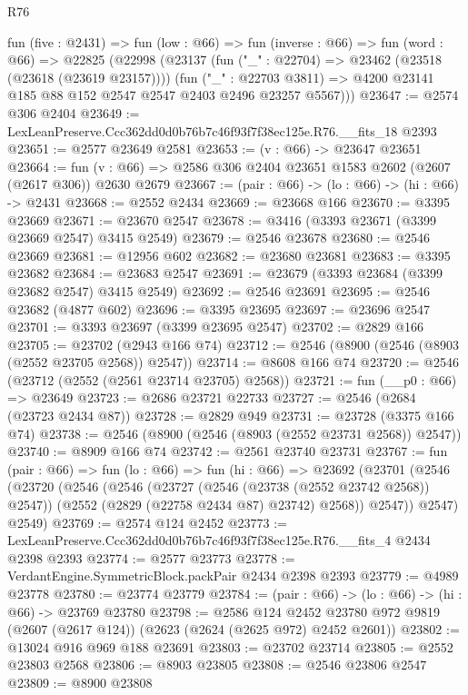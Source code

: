 \begin{lexlean}{R76}
\begin{coremodule}
  fun (five : @2431) =>
  fun (low : @66) =>
  fun (inverse : @66) =>
  fun (word : @66) =>
  @22825
    (@22998
      (@23137
        (fun ("_" : @22704) => @23462 (@23518 (@23618 (@23619 @23157))))
        (fun ("_" : @22703 @3811) =>
        @4200 @23141 @185 @88 @152 @2547 @2547 @2403 @2496 @23257 @5567)))
@23647 := @2574 @306 @2404
@23649 := LexLeanPreserve.Ccc362dd0d0b76b7c46f93f7f38ec125e.R76.__fits_18 @2393
@23651 := @2577 @23649 @2581
@23653 := (v : @66) -> @23647 @23651
@23664 := fun (v : @66) => @2586 @306 @2404 @23651 @1583 @2602 (@2607 (@2617 @306)) @2630 @2679
@23667 := (pair : @66) -> (lo : @66) -> (hi : @66) -> @2431
@23668 := @2552 @2434
@23669 := @23668 @166
@23670 := @3395 @23669
@23671 := @23670 @2547
@23678 := @3416 (@3393 @23671 (@3399 @23669 @2547) @3415 @2549)
@23679 := @2546 @23678
@23680 := @2546 @23669
@23681 := @12956 @602
@23682 := @23680 @23681
@23683 := @3395 @23682
@23684 := @23683 @2547
@23691 := @23679 (@3393 @23684 (@3399 @23682 @2547) @3415 @2549)
@23692 := @2546 @23691
@23695 := @2546 @23682 (@4877 @602)
@23696 := @3395 @23695
@23697 := @23696 @2547
@23701 := @3393 @23697 (@3399 @23695 @2547)
@23702 := @2829 @166
@23705 := @23702 (@2943 @166 @74)
@23712 := @2546 (@8900 (@2546 (@8903 (@2552 @23705 @2568)) @2547))
@23714 := @8608 @166 @74
@23720 := @2546 (@23712 (@2552 (@2561 @23714 @23705) @2568))
@23721 := fun (__p0 : @66) => @23649
@23723 := @2686 @23721 @22733
@23727 := @2546 (@2684 (@23723 @2434 @87))
@23728 := @2829 @949
@23731 := @23728 (@3375 @166 @74)
@23738 := @2546 (@8900 (@2546 (@8903 (@2552 @23731 @2568)) @2547))
@23740 := @8909 @166 @74
@23742 := @2561 @23740 @23731
@23767 := fun (pair : @66) =>
  fun (lo : @66) =>
  fun (hi : @66) =>
  @23692
    (@23701
      (@2546
        (@23720
          (@2546
            (@2546
              (@23727 (@2546 (@23738 (@2552 @23742 @2568)) @2547))
              (@2552 (@2829 (@22758 @2434 @87) @23742) @2568))
            @2547))
        @2547)
      @2549)
@23769 := @2574 @124 @2452
@23773 := LexLeanPreserve.Ccc362dd0d0b76b7c46f93f7f38ec125e.R76.__fits_4 @2434 @2398 @2393
@23774 := @2577 @23773
@23778 := VerdantEngine.SymmetricBlock.packPair @2434 @2398 @2393
@23779 := @4989 @23778
@23780 := @23774 @23779
@23784 := (pair : @66) -> (lo : @66) -> (hi : @66) -> @23769 @23780
@23798 := @2586
    @124
    @2452
    @23780
    @972
    @9819
    (@2607 (@2617 @124))
    (@2623 (@2624 (@2625 @972) @2452 @2601))
@23802 := @13024 @916 @969 @188 @23691
@23803 := @23702 @23714
@23805 := @2552 @23803 @2568
@23806 := @8903 @23805
@23808 := @2546 @23806 @2547
@23809 := @8900 @23808

\end{coremodule}
\end{lexlean}
